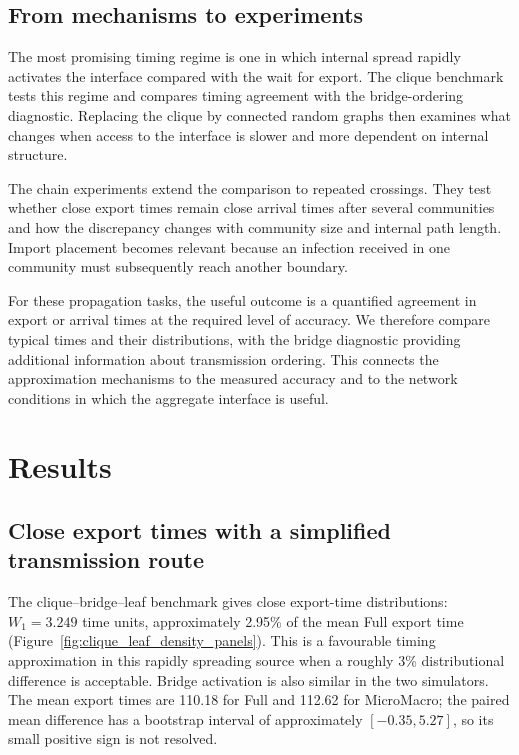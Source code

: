\documentclass[a4paper,fleqn]{cas-sc}
\begin{document}
\subsection{From mechanisms to experiments}

The most promising timing regime is one in which internal spread rapidly activates the interface compared with the wait for export. The clique benchmark tests this regime and compares timing agreement with the bridge-ordering diagnostic. Replacing the clique by connected random graphs then examines what changes when access to the interface is slower and more dependent on internal structure.

The chain experiments extend the comparison to repeated crossings. They test whether close export times remain close arrival times after several communities and how the discrepancy changes with community size and internal path length. Import placement becomes relevant because an infection received in one community must subsequently reach another boundary.

For these propagation tasks, the useful outcome is a quantified agreement in export or arrival times at the required level of accuracy. We therefore compare typical times and their distributions, with the bridge diagnostic providing additional information about transmission ordering. This connects the approximation mechanisms to the measured accuracy and to the network conditions in which the aggregate interface is useful.



\section{Results}
\label{sec:results}

\subsection{Close export times with a simplified transmission route}
\label{sec:clique_leaf_numerical}

The clique--bridge--leaf benchmark gives close export-time distributions: $W_1=3.249$ time units, approximately 2.95\% of the mean Full export time (Figure~\ref{fig:clique_leaf_density_panels}). This is a favourable timing approximation in this rapidly spreading source when a roughly 3\% distributional difference is acceptable. Bridge activation is also similar in the two simulators. The mean export times are 110.18 for Full and 112.62 for MicroMacro; the paired mean difference has a bootstrap interval of approximately $[-0.35,5.27]$, so its small positive sign is not resolved.
\end{document}
